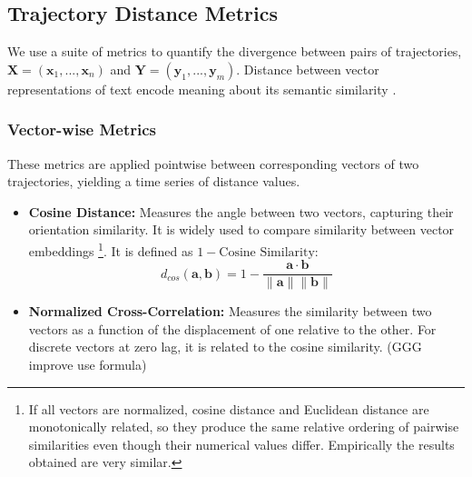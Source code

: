 \documentclass[a4paper,12pt]{article}
\begin{document}
\subsection{Trajectory Distance Metrics}
\label{subsec:trajectory_distance_metrics}
We use a suite of metrics to quantify the divergence between pairs of trajectories, $\mathbf{X} = (\mathbf{x}_1, ..., \mathbf{x}_n)$ and $\mathbf{Y} = (\mathbf{y}_1, ..., \mathbf{y}_m)$. Distance between vector representations of text encode meaning about its semantic similarity \cite{text2vec} \cite{reimers2019sentencebertsentenceembeddingsusing} .

\subsubsection{Vector-wise Metrics}
\label{sssec:methods_vector_metrics}
These metrics are applied pointwise between corresponding vectors of two trajectories, yielding a time series of distance values.
\begin{itemize}
    \item \textbf{Cosine Distance:} Measures the angle between two vectors, capturing their orientation similarity. It is widely used to compare similarity between vector embeddings \footnote{If all vectors are normalized, cosine distance and Euclidean distance are monotonically related, so they produce the same relative ordering of pairwise similarities even though their numerical values differ. Empirically the results obtained are very similar.}. It is defined as $1 - \text{Cosine Similarity}$:
    \begin{equation}
        d_{cos}(\mathbf{a}, \mathbf{b}) = 1 - \frac{\mathbf{a} \cdot \mathbf{b}}{\|\mathbf{a}\| \|\mathbf{b}\|}
    \end{equation}
    \item \textbf{Normalized Cross-Correlation:} Measures the similarity between two vectors as a function of the displacement of one relative to the other. For discrete vectors at zero lag, it is related to the cosine similarity. (GGG improve use formula)
\end{itemize}
\end{document}
